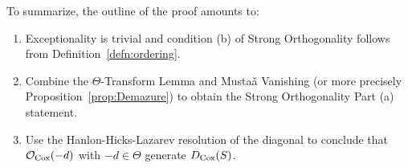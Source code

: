 \documentclass{amsart}
\begin{document}
To summarize, the outline of the proof amounts to:
\begin{enumerate}
    \item  Exceptionality is trivial and condition (b) of Strong Orthogonality follows from Definition~\ref{defn:ordering}.
    \item  Combine the $\Theta$-Transform Lemma and Musta\v{a} Vanishing (or more precisely Proposition~\ref{prop:Demazure}) to obtain the Strong Orthogonality Part (a) statement.
    \item Use the Hanlon-Hicks-Lazarev resolution of the diagonal to conclude that ${\mathcal O}_{\operatorname{Cox}}(-d)$ with $-d\in \Theta$ generate $D_{\operatorname{Cox}}(S)$.
\end{enumerate}





\end{document}
